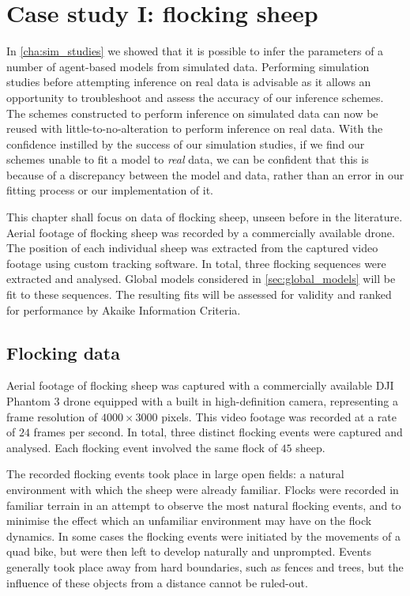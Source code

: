 \graphicspath{{fig/sheep/}}

\chapter{Case study I: flocking sheep}
\label{cha:sheep}

In \cref{cha:sim_studies} we showed that it is possible to infer the parameters
of a number of agent-based models from simulated data. Performing simulation
studies before attempting inference on real data is advisable as it allows an
opportunity to troubleshoot and assess the accuracy of our inference schemes.
The schemes constructed to perform inference on simulated data can now be
reused with little-to-no-alteration to perform inference on real data. With the
confidence instilled by the success of our simulation studies, if we find our
schemes unable to fit a model to \emph{real} data, we can be confident that
this is because of a discrepancy between the model and data, rather than an
error in our fitting process or our implementation of it.

This chapter shall focus on data of flocking sheep, unseen before in the
literature. Aerial footage of flocking sheep was recorded by a commercially
available drone. The position of each individual sheep was extracted from the
captured video footage using custom tracking software. In total, three flocking
sequences were extracted and analysed. Global models considered in
\cref{sec:global_models} will be fit to these sequences. The resulting fits
will be assessed for validity and ranked for performance by Akaike Information
Criteria.

\section{Flocking data}
\label{sec:data}

Aerial footage of flocking sheep was captured with a commercially available DJI
Phantom $3$ drone equipped with a built in high-definition camera, representing
a frame resolution of $4000\times3000$ pixels. This video footage was recorded
at a rate of $24$ frames per second. In total, three distinct flocking events
were captured and analysed. Each flocking event involved the same flock of $45$
sheep.

The recorded flocking events took place in large open fields: a natural
environment with which the sheep were already familiar. Flocks were recorded in
familiar terrain in an attempt to observe the most natural flocking events, and
to minimise the effect which an unfamiliar environment may have on the flock
dynamics. In some cases the flocking events were initiated by the movements of
a quad bike, but were then left to develop naturally and unprompted. Events
generally took place away from hard boundaries, such as fences and trees, but
the influence of these objects from a distance cannot be ruled-out.

